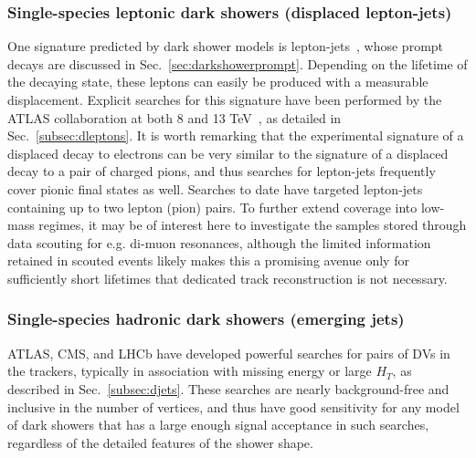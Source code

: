 \begin{enumerate}
\subsubsection{Single-species leptonic dark showers (displaced lepton-jets)}
\label{sec:leptonjetsoffline}
One signature predicted by dark shower models is lepton-jets~\cite{Falkowski:2010cm,Falkowski:2010gv}, whose prompt decays are discussed in Sec.~\ref{sec:darkshowerprompt}. Depending on the lifetime of the decaying state, these leptons can easily be produced with a measurable displacement. Explicit searches for this signature  have been performed by the ATLAS collaboration at both 8 and 13 TeV~\cite{Aad:2014yea, ATLAS:2016jza}, as detailed in Sec.~\ref{subsec:dleptons}. It is worth remarking that the experimental signature of a displaced decay to electrons can be very similar to the signature of a displaced decay to a pair of charged pions, and thus searches for lepton-jets frequently cover pionic final states as well.  Searches to date have targeted lepton-jets containing up to two lepton (pion) pairs.
To further extend coverage into low-mass regimes, it may be of interest here to investigate the samples stored through data scouting for e.g. di-muon resonances, although the limited information retained in scouted events likely makes this a promising avenue only for sufficiently short lifetimes that dedicated track reconstruction is not necessary.


\subsubsection{Single-species hadronic dark showers (emerging jets)}
\label{sec:darkshoweremergingjets}


ATLAS, CMS, and LHCb have developed powerful searches for pairs of DVs in the trackers, typically in association with missing energy or large $H_T$, as described in Sec.~\ref{subsec:djets}. These searches are nearly background-free and inclusive in the number of vertices, and thus have good sensitivity for any model of dark showers that has a large enough signal acceptance in such searches, regardless of the detailed features of the shower shape.


\end{enumerate}
